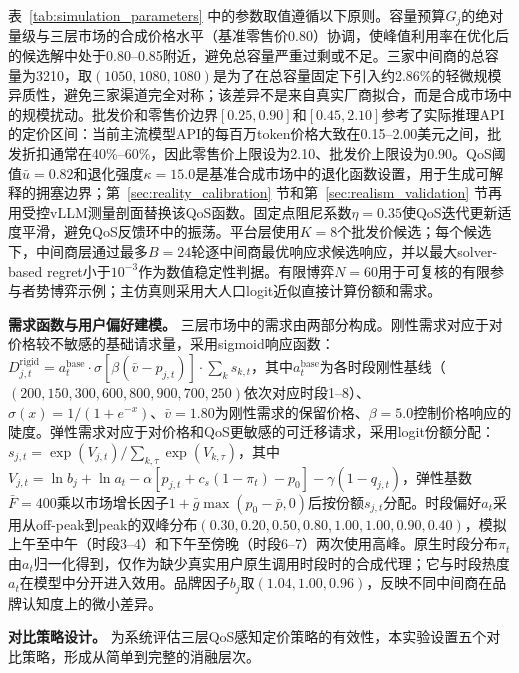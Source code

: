 \documentclass[UTF8,11pt]{ctexart}
\newcommand{\D}{D}
\begin{document}
表~\ref{tab:simulation_parameters} 中的参数取值遵循以下原则。容量预算$G_j$的绝对量级与三层市场的合成价格水平（基准零售价0.80）协调，使峰值利用率在优化后的候选解中处于0.80--0.85附近，避免总容量严重过剩或不足。三家中间商的总容量为3210，取$(1050,1080,1080)$是为了在总容量固定下引入约2.86\%的轻微规模异质性，避免三家渠道完全对称；该差异不是来自真实厂商拟合，而是合成市场中的规模扰动。批发价和零售价边界$[0.25,0.90]$和$[0.45,2.10]$参考了实际推理API的定价区间：当前主流模型API的每百万token价格大致在0.15--2.00美元之间，批发折扣通常在40\%--60\%，因此零售价上限设为2.10、批发价上限设为0.90。QoS阈值$\bar u=0.82$和退化强度$\kappa=15.0$是基准合成市场中的退化函数设置，用于生成可解释的拥塞边界；第~\ref{sec:reality_calibration} 节和第~\ref{sec:realism_validation} 节再用受控vLLM测量剖面替换该QoS函数。固定点阻尼系数$\eta=0.35$使QoS迭代更新适度平滑，避免QoS反馈环中的振荡。平台层使用$K=8$个批发价候选；每个候选下，中间商层通过最多$B=24$轮逐中间商最优响应求候选响应，并以最大solver-based regret小于$10^{-3}$作为数值稳定性判据。有限博弈$N=60$用于可复核的有限参与者势博弈示例；主仿真则采用大人口logit近似直接计算份额和需求。

\textbf{需求函数与用户偏好建模。} 三层市场中的需求由两部分构成。刚性需求对应于对价格较不敏感的基础请求量，采用sigmoid响应函数：$\D^{\text{rigid}}_{j,t} = a_t^{\text{base}} \cdot \sigma[\beta(\bar v - p_{j,t})] \cdot \sum_k s_{k,t}$，其中$a_t^{\text{base}}$为各时段刚性基线（$(200,150,300,600,800,900,700,250)$依次对应时段1--8）、$\sigma(x)=1/(1+e^{-x})$、$\bar v=1.80$为刚性需求的保留价格、$\beta=5.0$控制价格响应的陡度。弹性需求对应于对价格和QoS更敏感的可迁移请求，采用logit份额分配：$s_{j,t} = \exp(V_{j,t})/\sum_{k,\tau}\exp(V_{k,\tau})$，其中$V_{j,t} = \ln b_j + \ln a_t -\alpha[p_{j,t}+c_s(1-\pi_t)-p_0] - \gamma(1-q_{j,t})$，弹性基数$\bar F = 400$乘以市场增长因子$1+\bar g\max(p_0-\bar p, 0)$后按份额$s_{j,t}$分配。时段偏好$a_t$采用从off-peak到peak的双峰分布$(0.30,0.20,0.50,0.80,1.00,1.00,0.90,0.40)$，模拟上午至中午（时段3--4）和下午至傍晚（时段6--7）两次使用高峰。原生时段分布$\pi_t$由$a_t$归一化得到，仅作为缺少真实用户原生调用时段时的合成代理；它与时段热度$a_t$在模型中分开进入效用。品牌因子$b_j$取$(1.04,1.00,0.96)$，反映不同中间商在品牌认知度上的微小差异。

\textbf{对比策略设计。} 为系统评估三层QoS感知定价策略的有效性，本实验设置五个对比策略，形成从简单到完整的消融层次。
\end{document}
